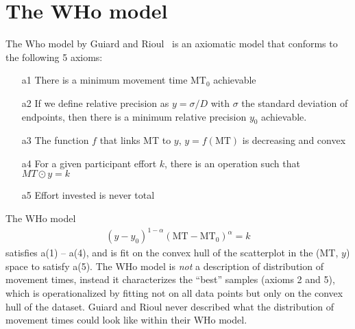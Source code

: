\documentclass[manuscript,review,anonymous]{acmart}
\begin{document}
\section{The WHo model \label{app:who}}
The Who model by Guiard and Rioul~\cite{guiard2015} is an axiomatic model that conforms to the following 5 axioms:
\begin{enumerate}
	\item[a1] There is a minimum movement time MT$_0$ achievable
	\item[a2] If we define relative precision as $y = \sigma/D$ with $\sigma$ the standard deviation of endpoints, then there is a minimum relative precision $y_0$ achievable.
	\item[a3] The function $f$ that links MT to $y$, $y=f(\text{MT})$ is decreasing and convex
	\item[a4] For a given participant effort $k$, there is an operation such that $MT \odot y = k$
	\item[a5] Effort invested is never total
\end{enumerate}
The WHo model
\begin{align}
	(y-y_0)^{1-\alpha} (\text{MT}-\text{MT}_0)^{\alpha} = k
\end{align}
satisfies a(1) -- a(4), and is fit on the convex hull of the scatterplot in the (MT, $y$) space to satisfy a(5).
The WHo model is \textit{not} a description of distribution of movement times, instead it characterizes the ``best'' samples (axioms 2 and 5), which is operationalized by fitting not on all data points but only on the convex hull of the dataset.
Guiard and Rioul never described what the distribution of movement times could look like within their WHo model.
\end{document}
